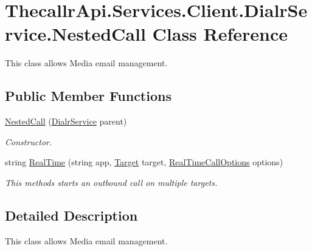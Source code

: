 \hypertarget{class_thecallr_api_1_1_services_1_1_client_1_1_dialr_service_1_1_nested_call}{\section{Thecallr\+Api.\+Services.\+Client.\+Dialr\+Service.\+Nested\+Call Class Reference}
\label{class_thecallr_api_1_1_services_1_1_client_1_1_dialr_service_1_1_nested_call}
}


This class allows Media email management.  


\subsection*{Public Member Functions}
\begin{DoxyCompactItemize}
\item 
\hyperlink{class_thecallr_api_1_1_services_1_1_client_1_1_dialr_service_1_1_nested_call_ab0b84272ec929aba1a07328107d9279d}{Nested\+Call} (\hyperlink{class_thecallr_api_1_1_services_1_1_client_1_1_dialr_service}{Dialr\+Service} parent)
\begin{DoxyCompactList}\small\item\em Constructor. \end{DoxyCompactList}\item 
string \hyperlink{class_thecallr_api_1_1_services_1_1_client_1_1_dialr_service_1_1_nested_call_a44dd5aa924d28b77ccbedc8761672176}{Real\+Time} (string app, \hyperlink{class_thecallr_api_1_1_objects_1_1_misc_1_1_target}{Target} target, \hyperlink{class_thecallr_api_1_1_objects_1_1_real_time_1_1_real_time_call_options}{Real\+Time\+Call\+Options} options)
\begin{DoxyCompactList}\small\item\em This methods starts an outbound call on multiple targets. \end{DoxyCompactList}\end{DoxyCompactItemize}


\subsection{Detailed Description}
This class allows Media email management. 



